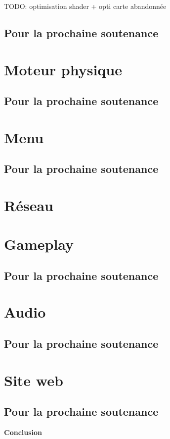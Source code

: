 \documentclass[11pt]{report}
\begin{document}
TODO: optimisation shader + opti carte abandonnée

\subsection{Pour la prochaine soutenance}

\newpage
\section{Moteur physique}

\subsection{Pour la prochaine soutenance}

\newpage
\section{Menu}

\subsection{Pour la prochaine soutenance}

\newpage
\section{Réseau}

\newpage
\section{Gameplay}

\subsection{Pour la prochaine soutenance}

\newpage
\section{Audio}

\subsection{Pour la prochaine soutenance}

\newpage
\section{Site web}

\subsection{Pour la prochaine soutenance}

\newpage
\textbf{{\huge Conclusion}} \vspace{7mm}

\newpage
\listoffigures 
 
\end{document}
